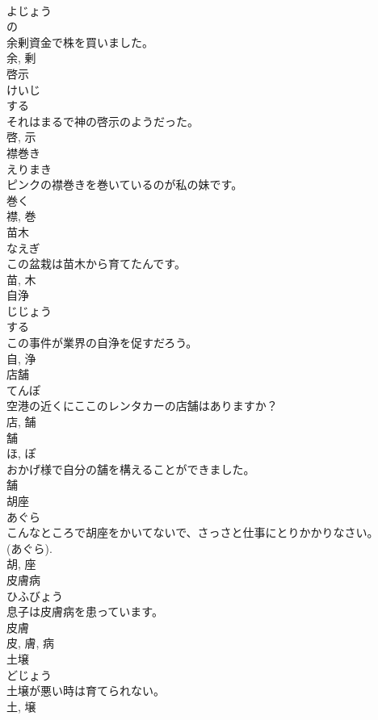 \documentclass[8pt]{extreport}
\begin{document}
\begin{CJK}{UTF8}{min}
\\	よじょう	
\\	の 
\\	余剰資金で株を買いました。	
\\	余, 剰	
\\	啓示	
\\	けいじ	
\\	する 
\\	それはまるで神の啓示のようだった。	
\\	啓, 示	
\\	襟巻き	
\\	えりまき	
\\	ピンクの襟巻きを巻いているのが私の妹です。	
\\	巻く 
\\	襟, 巻	
\\	苗木	
\\	なえぎ	
\\	この盆栽は苗木から育てたんです。	
\\	苗, 木	
\\	自浄	
\\	じじょう	
\\	する 
\\	この事件が業界の自浄を促すだろう。	
\\	自, 浄	
\\	店舗	
\\	てんぽ	
\\	空港の近くにここのレンタカーの店舗はありますか？	
\\	店, 舗	
\\	舗	
\\	ほ, ぽ	
\\	おかげ様で自分の舗を構えることができました。	
\\	舗	
\\	胡座	
\\	あぐら	
\\	こんなところで胡座をかいてないで、さっさと仕事にとりかかりなさい。	
\\	(あぐら). 
\\	胡, 座	
\\	皮膚病	
\\	ひふびょう	
\\	息子は皮膚病を患っています。	
\\	皮膚 
\\	皮, 膚, 病	
\\	土壌	
\\	どじょう	
\\	土壌が悪い時は育てられない。	
\\	土, 壌	

\end{CJK}
\end{document}
